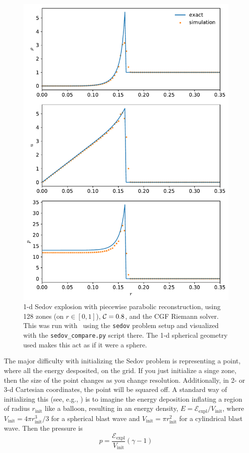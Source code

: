 \begin{figure}[t]
\centering
\includegraphics[width=0.7\linewidth]{hydro1d_sedov_1dsph}
\caption[1-d spherical Sedov problem]{\label{fig:Euler:sedov1d} 1-d Sedov explosion with
  piecewise parabolic reconstruction, using 128 zones (on $r \in
  [0,1]$), ${\mathcal{C}} = 0.8$, and the CGF Riemann solver.  This was run
  with \hydrooned\ using the {\tt sedov} problem setup and visualized
  with the {\tt sedov\_compare.py} script there.  The 1-d spherical
  geometry used makes this act as if it were a sphere.}
\end{figure}

The major difficulty with initializing the Sedov problem is
representing a point, where all the energy desposited, on the grid.
If you just initialize a singe zone, then the size of the point
changes as you change resolution.  Additionally, in 2- or 3-d
Cartesian coordinates, the point will be squared off.  A standard way
of initializing this (see, e.g., \cite{omang:2006}) is to imagine the
energy deposition inflating a region of radius $r_\mathrm{init}$ like
a balloon, resulting in an energy density, $E =
\mathcal{E}_\mathrm{expl}/V_\mathrm{init}$, where $V_\mathrm{init} =
4\pi r_\mathrm{init}^3/3$ for a spherical blast wave and
$V_\mathrm{init} = \pi r_\mathrm{init}^2$ for a cylindrical blast
wave. Then the pressure is
\begin{equation}
p = \frac{\mathcal{E}_\mathrm{expl}}{V_\mathrm{init}} (\gamma - 1)
\end{equation}


